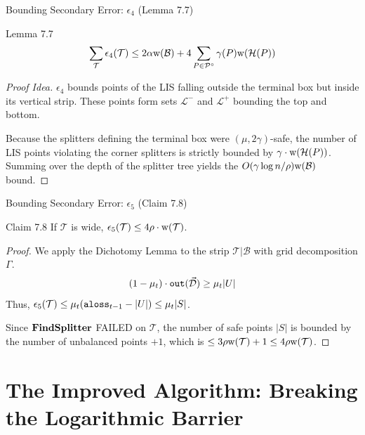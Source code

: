 \documentclass[11pt,aspectratio=169]{beamer}
\newcommand{\aloss}{{\tt aloss}}
\newcommand{\outside}{{\tt out}}
\newcommand{\width}{{\bf {\rm  w}}}
\newcommand{\findsplitter}{{\rm {\bf FindSplitter}}}
\newcommand{\cP}{{\cal P}}
\begin{document}
\begin{frame}{Bounding Secondary Error: $\epsilon_4$ (Lemma 7.7)}
    \begin{block}{Lemma 7.7}
        $$\sum_{\mathcal{T}} \epsilon_4(\mathcal{T}) \leq 2\alpha \width(\mathcal{B}) + 4 \sum_{P \in \cP^\circ} \gamma(P) \width(\mathcal{H}(P))$$
    \end{block}
    \begin{proof}[Proof Idea]
        $\epsilon_4$ bounds points of the LIS falling outside the terminal box but inside its vertical strip. These points form sets $\mathcal{L}^-$ and $\mathcal{L}^+$ bounding the top and bottom.
        
        Because the splitters defining the terminal box were $(\mu, 2\gamma)$-safe, the number of LIS points violating the corner splitters is strictly bounded by $\gamma \cdot \width(\mathcal{H}(P))$. Summing over the depth of the splitter tree yields the $O(\gamma \log n / \rho) \width(\mathcal{B})$ bound.
    \end{proof}
\end{frame}

\begin{frame}{Bounding Secondary Error: $\epsilon_5$ (Claim 7.8)}
    \begin{block}{Claim 7.8}
        If $\mathcal{T}$ is wide, $\epsilon_5(\mathcal{T}) \leq 4\rho \cdot \width(\mathcal{T})$.
    \end{block}
    \begin{proof}
        We apply the Dichotomy Lemma to the strip $\mathcal{T}|\mathcal{B}$ with grid decomposition $\Gamma$.
        $$(1-\mu_t) \cdot \outside(\vec{\mathcal{D}}) \geq \mu_t |U|$$
        Thus, $\epsilon_5(\mathcal{T}) \leq \mu_t (\aloss_{t-1} - |U|) \leq \mu_t |S|$.
        
        Since $\findsplitter$ FAILED on $\mathcal{T}$, the number of safe points $|S|$ is bounded by the number of unbalanced points $+1$, which is $\leq 3\rho \width(\mathcal{T}) + 1 \leq 4\rho \width(\mathcal{T})$.
    \end{proof}
\end{frame}

\section{The Improved Algorithm: Breaking the Logarithmic Barrier}
\end{document}

